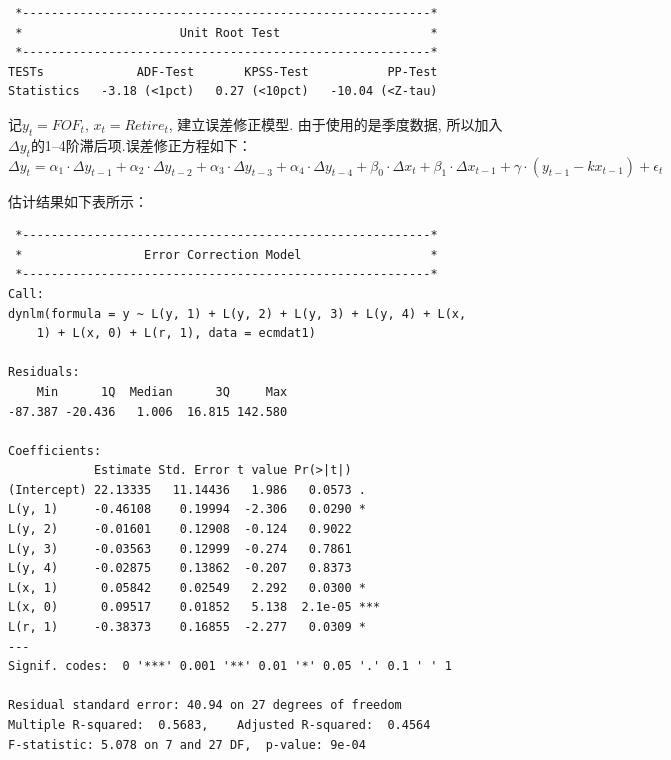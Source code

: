 \begin{framed}
\begin{verbatim}
 *---------------------------------------------------------*
 *                      Unit Root Test                     *
 *---------------------------------------------------------*    
TESTs             ADF-Test       KPSS-Test           PP-Test
Statistics   -3.18 (<1pct)   0.27 (<10pct)   -10.04 (<Z-tau)
\end{verbatim}
\end{framed}

记$y_t = FOF_t$, $x_t = Retire_t$, 建立误差修正模型. 由于使用的是季度数据, 所以加入$\Delta y_t$的1--4阶滞后项.误差修正方程如下：
$$
\Delta y_t = \alpha_1 \cdot \Delta y_{t-1} + \alpha_2  \cdot \Delta  y_{t-2} + \alpha_3 \cdot \Delta  y_{t-3} + \alpha_4 \cdot \Delta  y_{t-4} + \beta_0 \cdot \Delta  x_t+\beta_1 \cdot \Delta  x_{t-1} + \gamma \cdot ( y_{t-1}-kx_{t-1}) + \epsilon_t
$$


估计结果如下表所示：

\begin{framed}
\begin{verbatim}
 *---------------------------------------------------------*
 *                 Error Correction Model                  *
 *---------------------------------------------------------* 
Call:
dynlm(formula = y ~ L(y, 1) + L(y, 2) + L(y, 3) + L(y, 4) + L(x, 
    1) + L(x, 0) + L(r, 1), data = ecmdat1)

Residuals:
    Min      1Q  Median      3Q     Max 
-87.387 -20.436   1.006  16.815 142.580 

Coefficients:
            Estimate Std. Error t value Pr(>|t|)    
(Intercept) 22.13335   11.14436   1.986   0.0573 .  
L(y, 1)     -0.46108    0.19994  -2.306   0.0290 *  
L(y, 2)     -0.01601    0.12908  -0.124   0.9022    
L(y, 3)     -0.03563    0.12999  -0.274   0.7861    
L(y, 4)     -0.02875    0.13862  -0.207   0.8373    
L(x, 1)      0.05842    0.02549   2.292   0.0300 *  
L(x, 0)      0.09517    0.01852   5.138  2.1e-05 ***
L(r, 1)     -0.38373    0.16855  -2.277   0.0309 *  
---
Signif. codes:  0 '***' 0.001 '**' 0.01 '*' 0.05 '.' 0.1 ' ' 1

Residual standard error: 40.94 on 27 degrees of freedom
Multiple R-squared:  0.5683,    Adjusted R-squared:  0.4564 
F-statistic: 5.078 on 7 and 27 DF,  p-value: 9e-04
\end{verbatim}
\end{framed}


